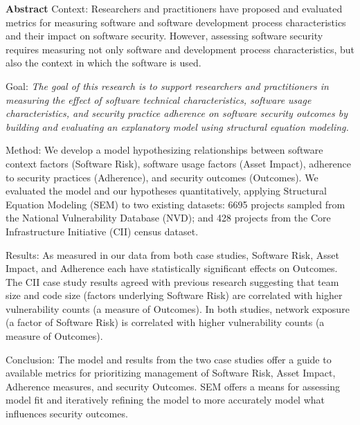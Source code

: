 \label{sec:abstract}
\textbf{Abstract} 
Context: Researchers and practitioners have proposed and evaluated metrics for measuring software and software development process characteristics and their impact on software security. However, assessing software security requires measuring not only software and development process characteristics, but also the context in which the software is used. 

Goal:  \textit{The goal of this research is to support researchers and practitioners in measuring the effect of software technical characteristics, software usage characteristics, and security practice adherence on software security outcomes by building and evaluating an explanatory model using structural equation modeling.} 

Method: We develop a model hypothesizing relationships between software context factors (Software Risk), software usage factors (Asset Impact), adherence to security practices (Adherence), and security outcomes (Outcomes).  We evaluated the model and our hypotheses quantitatively, applying Structural Equation Modeling (SEM) to two existing datasets: 6695 projects sampled from the National Vulnerability Database (NVD); and 428 projects from the Core Infrastructure Initiative (CII) census dataset.  

Results: As measured in our data from both case studies, Software Risk, Asset Impact, and Adherence each have statistically significant effects on Outcomes. The CII case study results agreed with previous research suggesting that team size and code size (factors underlying Software Risk) are correlated with higher vulnerability counts (a measure of Outcomes). In both studies, network exposure (a factor of Software Risk) is correlated with higher vulnerability counts (a measure of Outcomes).

Conclusion: The model and results from the two case studies offer a guide to available metrics for prioritizing management of Software Risk, Asset Impact, Adherence measures, and security Outcomes. SEM offers a means for assessing model fit and iteratively refining the model to more accurately model what influences security outcomes.